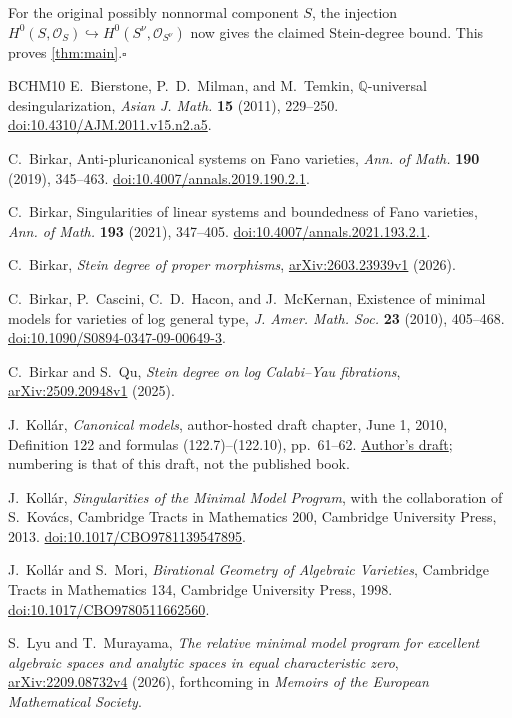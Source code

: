 \documentclass[11pt]{article}
\numberwithin{equation}{section}
\theoremstyle{definition}
\newcommand{\Q}{\mathbb Q}
\newcommand{\OO}{\mathcal O}
\begin{document}
For the original possibly nonnormal component $S$, the injection
$H^0(S,\OO_S)\hookrightarrow H^0(S^\nu,\OO_{S^\nu})$ now gives the
claimed Stein-degree bound. This proves \cref{thm:main}.\hfill$\square$

\begin{thebibliography}{BCHM10}
E.~Bierstone, P.~D.~Milman, and M.~Temkin,
$\Q$-universal desingularization,
\emph{Asian J. Math.} \textbf{15} (2011), 229--250.
\href{https://doi.org/10.4310/AJM.2011.v15.n2.a5}{doi:10.4310/AJM.2011.v15.n2.a5}.

C.~Birkar, Anti-pluricanonical systems on Fano varieties,
\emph{Ann. of Math.} \textbf{190} (2019), 345--463.
\href{https://doi.org/10.4007/annals.2019.190.2.1}{doi:10.4007/annals.2019.190.2.1}.

C.~Birkar, Singularities of linear systems and boundedness of Fano varieties,
\emph{Ann. of Math.} \textbf{193} (2021), 347--405.
\href{https://doi.org/10.4007/annals.2021.193.2.1}{doi:10.4007/annals.2021.193.2.1}.

C.~Birkar, \emph{Stein degree of proper morphisms},
\href{https://arxiv.org/abs/2603.23939v1}{arXiv:2603.23939v1} (2026).

C.~Birkar, P.~Cascini, C.~D.~Hacon, and J.~McKernan,
Existence of minimal models for varieties of log general type,
\emph{J. Amer. Math. Soc.} \textbf{23} (2010), 405--468.
\href{https://doi.org/10.1090/S0894-0347-09-00649-3}{doi:10.1090/S0894-0347-09-00649-3}.

C.~Birkar and S.~Qu, \emph{Stein degree on log Calabi--Yau fibrations},
\href{https://arxiv.org/abs/2509.20948v1}{arXiv:2509.20948v1} (2025).

J.~Koll\'ar, \emph{Canonical models}, author-hosted draft chapter,
June 1, 2010, Definition 122 and formulas (122.7)--(122.10), pp.~61--62.
\href{https://web.math.princeton.edu/~kollar/book/chap2.pdf}{Author's draft};
numbering is that of this draft, not the published book.

J.~Koll\'ar, \emph{Singularities of the Minimal Model Program},
with the collaboration of S.~Kov\'acs, Cambridge Tracts in Mathematics 200,
Cambridge University Press, 2013.
\href{https://doi.org/10.1017/CBO9781139547895}{doi:10.1017/CBO9781139547895}.

J.~Koll\'ar and S.~Mori, \emph{Birational Geometry of Algebraic Varieties},
Cambridge Tracts in Mathematics 134, Cambridge University Press, 1998.
\href{https://doi.org/10.1017/CBO9780511662560}{doi:10.1017/CBO9780511662560}.

S.~Lyu and T.~Murayama, \emph{The relative minimal model program for
excellent algebraic spaces and analytic spaces in equal characteristic zero},
\href{https://arxiv.org/abs/2209.08732v4}{arXiv:2209.08732v4} (2026),
forthcoming in \emph{Memoirs of the European Mathematical Society}.
\end{thebibliography}
\end{document}
